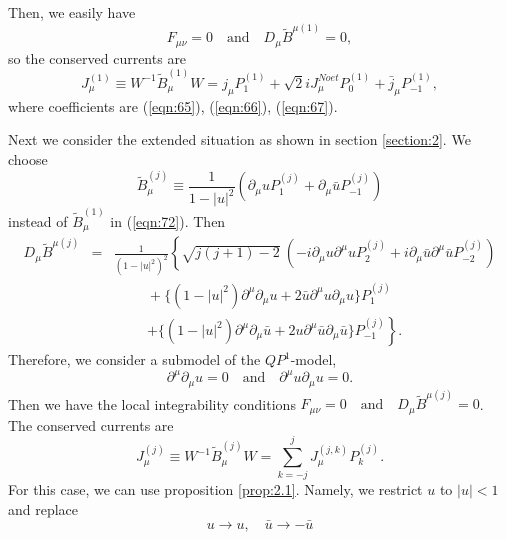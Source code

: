 \documentclass[makeidx,12pt,openany]{report}
\begin{document}
Then, we easily have 
\begin{equation}
 F_{\mu \nu}=0 \quad \mbox{and} \quad D_{\mu}\tilde{B}^{\mu (1)}=0, 
\end{equation}
so the conserved currents are
\begin{equation}
 J_{\mu}^{(1)} \equiv W^{-1} \tilde{B}_{\mu}^{(1)} W 
               = j_{\mu}P_1^{(1)}+\sqrt{2}iJ_{\mu}^{Noet}P_0^{(1)}
                         +\bar{j}_{\mu}P_{-1}^{(1)}, 
\end{equation}
where coefficients are (\ref{eqn:65}), (\ref{eqn:66}), (\ref{eqn:67}). 

Next we consider the extended situation as shown in section \ref{section:2}. 
We choose
\begin{equation}
 \tilde{B}_{\mu}^{(j)} \equiv \frac{1}{1-|u|^2}
             (\partial_{\mu}u P_1^{(j)}+\partial_{\mu}\bar{u} P_{-1}^{(j)})
\end{equation}
instead of $\tilde{B}_{\mu}^{(1)}$ in (\ref{eqn:72}). Then 
\begin{eqnarray}
 D_{\mu}\tilde{B}^{\mu (j)} &=& \frac{1}{(1-|u|^2)^2}
     \left\{ \sqrt{j(j+1)-2} \ 
      (-i\partial_{\mu}u\partial^{\mu}u P_2^{(j)}
       +i\partial_{\mu}\bar{u}\partial^{\mu}\bar{u} P_{-2}^{(j)}) 
     \right. \nonumber\\
  && \hspace{1cm}
     +\{(1-|u|^2)\partial^{\mu}\partial_{\mu}u
        +2\bar{u}\partial^{\mu}u\partial_{\mu}u \} P_1^{(j)} \nonumber\\
  && \hspace{1cm}
     \left.
     +\{(1-|u|^2)\partial^{\mu}\partial_{\mu}\bar{u}
        +2u\partial^{\mu}\bar{u}\partial_{\mu}\bar{u} \} P_{-1}^{(j)}
     \right\} .
\end{eqnarray}
Therefore, we consider a submodel of the $QP^1$-model, 
\begin{equation}
 \partial^{\mu}\partial_{\mu}u=0 \quad \mbox{and} \quad 
 \partial^{\mu}u\partial_{\mu}u=0. 
\end{equation}
Then we have the local integrability conditions
$ F_{\mu \nu}=0 \quad \mbox{and} \quad D_{\mu}\tilde{B}^{\mu (j)}=0 $. 
The conserved currents are 
\begin{equation}
 J_{\mu}^{(j)} \equiv W^{-1} \tilde{B}_{\mu}^{(j)} W
   =\sum_{k=-j}^{j} J_{\mu}^{(j,k)}P_k^{(j)}. 
\end{equation}
For this case, we can use proposition \ref{prop:2.1}. Namely, we restrict $u$ 
to $|u| < 1$ and replace
\begin{equation}
 u \rightarrow u, \quad \bar{u} \rightarrow -\bar{u}
\end{equation}
\end{document}
